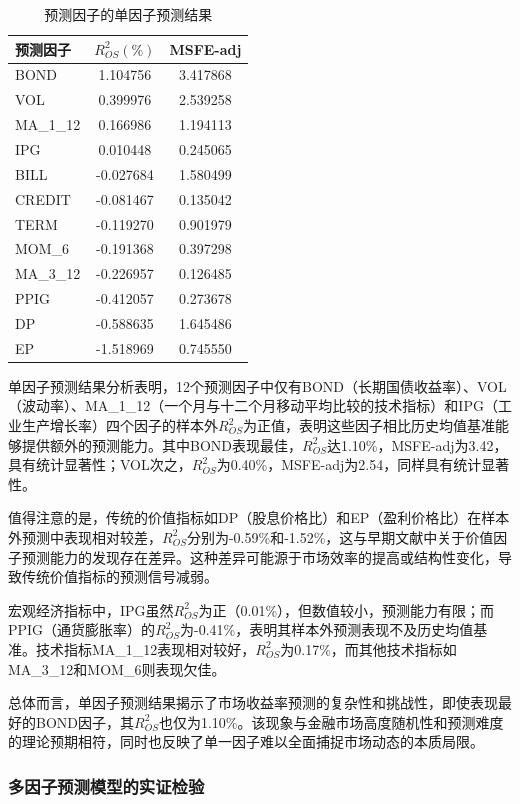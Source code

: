 \documentclass[12pt, a4paper]{article}
\begin{document}
\begin{table}[htbp]
\centering
\caption{预测因子的单因子预测结果}
\label{tab:single_factor}
\begin{tabular}{lcc}
\toprule
预测因子 & $R^2_{OS}(\%)$ & MSFE-adj \\
\midrule
BOND & 1.104756 & 3.417868 \\
VOL & 0.399976 & 2.539258 \\
MA\_1\_12 & 0.166986 & 1.194113 \\
IPG & 0.010448 & 0.245065 \\
BILL & -0.027684 & 1.580499 \\
CREDIT & -0.081467 & 0.135042 \\
TERM & -0.119270 & 0.901979 \\
MOM\_6 & -0.191368 & 0.397298 \\
MA\_3\_12 & -0.226957 & 0.126485 \\
PPIG & -0.412057 & 0.273678 \\
DP & -0.588635 & 1.645486 \\
EP & -1.518969 & 0.745550 \\
\bottomrule
\end{tabular}
\end{table}

单因子预测结果分析表明，12个预测因子中仅有BOND（长期国债收益率）、VOL（波动率）、MA\_1\_12（一个月与十二个月移动平均比较的技术指标）和IPG（工业生产增长率）四个因子的样本外$R^2_{OS}$为正值，表明这些因子相比历史均值基准能够提供额外的预测能力。其中BOND表现最佳，$R^2_{OS}$达1.10\%，MSFE-adj为3.42，具有统计显著性；VOL次之，$R^2_{OS}$为0.40\%，MSFE-adj为2.54，同样具有统计显著性。

值得注意的是，传统的价值指标如DP（股息价格比）和EP（盈利价格比）在样本外预测中表现相对较差，$R^2_{OS}$分别为-0.59\%和-1.52\%，这与早期文献中关于价值因子预测能力的发现存在差异。这种差异可能源于市场效率的提高或结构性变化，导致传统价值指标的预测信号减弱。

宏观经济指标中，IPG虽然$R^2_{OS}$为正（0.01\%），但数值较小，预测能力有限；而PPIG（通货膨胀率）的$R^2_{OS}$为-0.41\%，表明其样本外预测表现不及历史均值基准。技术指标MA\_1\_12表现相对较好，$R^2_{OS}$为0.17\%，而其他技术指标如MA\_3\_12和MOM\_6则表现欠佳。

总体而言，单因子预测结果揭示了市场收益率预测的复杂性和挑战性，即使表现最好的BOND因子，其$R^2_{OS}$也仅为1.10\%。该现象与金融市场高度随机性和预测难度的理论预期相符，同时也反映了单一因子难以全面捕捉市场动态的本质局限。

\subsubsection{多因子预测模型的实证检验}
\end{document}
